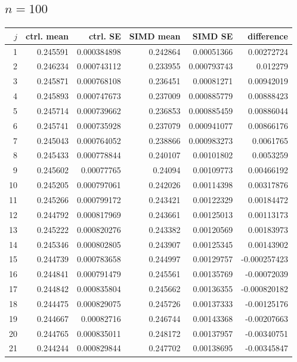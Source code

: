 \documentclass[10pt]{article}
\begin{document}
\subsection{$n=100$}
\begin{longtable}{rrrrrr}
\toprule
$j$ & ctrl. mean & ctrl. SE & SIMD mean & SIMD SE & difference\\
\midrule\endhead
1 & 0.245591 & 0.000384898 & 0.242864 & 0.00051366 & 0.00272724 \\
2 & 0.246234 & 0.000743112 & 0.233955 & 0.000793743 & 0.012279 \\
3 & 0.245871 & 0.000768108 & 0.236451 & 0.00081271 & 0.00942019 \\
4 & 0.245893 & 0.000747673 & 0.237009 & 0.000885779 & 0.00888423 \\
5 & 0.245714 & 0.000739662 & 0.236853 & 0.000885459 & 0.00886044 \\
6 & 0.245741 & 0.000735928 & 0.237079 & 0.000941077 & 0.00866176 \\
7 & 0.245043 & 0.000764052 & 0.238866 & 0.000983273 & 0.0061765 \\
8 & 0.245433 & 0.000778844 & 0.240107 & 0.00101802 & 0.0053259 \\
9 & 0.245602 & 0.00077765 & 0.24094 & 0.00109773 & 0.00466192 \\
10 & 0.245205 & 0.000797061 & 0.242026 & 0.00114398 & 0.00317876 \\
11 & 0.245266 & 0.000799172 & 0.243421 & 0.00122329 & 0.00184472 \\
12 & 0.244792 & 0.000817969 & 0.243661 & 0.00125013 & 0.00113173 \\
13 & 0.245222 & 0.000820276 & 0.243382 & 0.00120569 & 0.00183973 \\
14 & 0.245346 & 0.000802805 & 0.243907 & 0.00125345 & 0.00143902 \\
15 & 0.244739 & 0.000783658 & 0.244997 & 0.00129757 & -0.000257423 \\
16 & 0.244841 & 0.000791479 & 0.245561 & 0.00135769 & -0.00072039 \\
17 & 0.244842 & 0.000835804 & 0.245662 & 0.00136355 & -0.000820182 \\
18 & 0.244475 & 0.000829075 & 0.245726 & 0.00137333 & -0.00125176 \\
19 & 0.244667 & 0.00082716 & 0.246744 & 0.00143368 & -0.00207663 \\
20 & 0.244765 & 0.000835011 & 0.248172 & 0.00137957 & -0.00340751 \\
21 & 0.244244 & 0.000829844 & 0.247702 & 0.00138695 & -0.00345847 \\

\end{longtable}
\end{document}
